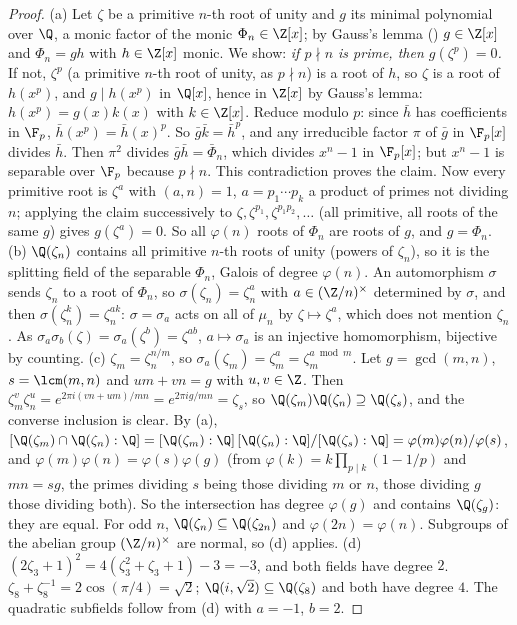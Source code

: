 \begin{proof}
(a) Let $\zeta$ be a primitive $n$-th root of unity and $g$ its minimal polynomial over $\Q$, a monic factor of the monic $\Phi_n\in\Z[x]$; by Gauss's lemma
() $g\in\Z[x]$ and $\Phi_n=gh$ with $h\in\Z[x]$ monic. We show: \emph{if $p\nmid n$ is prime, then $g(\zeta^p)=0$.} If not, $\zeta^p$ (a primitive
$n$-th root of unity, as $p\nmid n$) is a root of $h$, so $\zeta$ is a root of $h(x^p)$, and $g\mid h(x^p)$ in $\Q[x]$, hence in $\Z[x]$ by Gauss's lemma:
$h(x^p)=g(x)k(x)$ with $k\in\Z[x]$. Reduce modulo $p$: since $\bar h$ has coefficients in $\F_p$, $\bar h(x^p)=\bar h(x)^p$. So $\bar g\bar k=\bar h^p$, and any
irreducible factor $\pi$ of $\bar g$ in $\F_p[x]$ divides $\bar h$. Then $\pi^2$ divides $\bar g\bar h=\bar\Phi_n$, which divides $x^n-1$ in $\F_p[x]$; but $x^n-1$
is separable over $\F_p$ because $p\nmid n$. This contradiction proves the claim. Now every primitive root is $\zeta^a$ with $(a,n)=1$, $a=p_1\cdots p_k$ a product
of primes not dividing $n$; applying the claim successively to $\zeta,\zeta^{p_1},\zeta^{p_1p_2},\dots$ (all primitive, all roots of the same $g$) gives
$g(\zeta^a)=0$. So all $\varphi(n)$ roots of $\Phi_n$ are roots of $g$, and $g=\Phi_n$.
(b) $\Q(\zeta_n)$ contains all primitive $n$-th roots of unity (powers of $\zeta_n$), so it is the splitting field of the separable $\Phi_n$, Galois of degree
$\varphi(n)$. An automorphism $\sigma$ sends $\zeta_n$ to a root of $\Phi_n$, so $\sigma(\zeta_n)=\zeta_n^{a}$ with $a\in(\Z/n)^\times$ determined by $\sigma$, and
then $\sigma(\zeta_n^k)=\zeta_n^{ak}$: $\sigma=\sigma_a$ acts on all of $\mu_n$ by $\zeta\mapsto\zeta^a$, which does not mention $\zeta_n$. As
$\sigma_a\sigma_b(\zeta)=\sigma_a(\zeta^b)=\zeta^{ab}$, $a\mapsto\sigma_a$ is an injective homomorphism, bijective by counting.
(c) $\zeta_m=\zeta_n^{n/m}$, so $\sigma_a(\zeta_m)=\zeta_m^a=\zeta_m^{a\bmod m}$. Let $g=\gcd(m,n)$, $s=\lcm(m,n)$ and $um+vn=g$ with $u,v\in\Z$. Then
$\zeta_m^v\zeta_n^u=e^{2\pi i(vn+um)/mn}=e^{2\pi ig/mn}=\zeta_s$, so $\Q(\zeta_m)\Q(\zeta_n)\supseteq\Q(\zeta_s)$, and the converse inclusion is clear. By
(a), $[\Q(\zeta_m)\cap\Q(\zeta_n):\Q]=[\Q(\zeta_m):\Q]\,[\Q(\zeta_n):\Q]/[\Q(\zeta_s):\Q]=\varphi(m)\varphi(n)/\varphi(s)$, and
$\varphi(m)\varphi(n)=\varphi(s)\varphi(g)$ (from $\varphi(k)=k\prod_{p\mid k}(1-1/p)$ and $mn=sg$, the primes dividing $s$ being those dividing $m$ or $n$, those
dividing $g$ those dividing both). So the intersection has degree $\varphi(g)$ and contains $\Q(\zeta_g)$: they are equal. For odd $n$, $\Q(\zeta_n)\subseteq
\Q(\zeta_{2n})$ and $\varphi(2n)=\varphi(n)$. Subgroups of the abelian group $(\Z/n)^\times$ are normal, so (d) applies.
(d) $(2\zeta_3+1)^2=4(\zeta_3^2+\zeta_3+1)-3=-3$, and both fields have degree $2$. $\zeta_8+\zeta_8^{-1}=2\cos(\pi/4)=\sqrt2$; $\Q(i,\sqrt2)\subseteq\Q(\zeta_8)$ and both
have degree $4$. The quadratic subfields follow from (d) with $a=-1$, $b=2$.
\end{proof}

